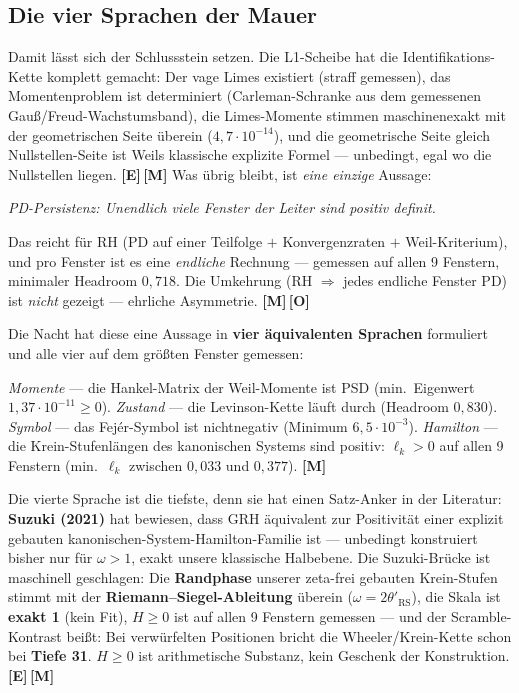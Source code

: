 \documentclass[11pt,a4paper]{article}
\newcommand{\E}{\textcolor{gut}{\textbf{[E]}}}
\newcommand{\OO}{\textcolor{offen}{\textbf{[O]}}}
\newcommand{\M}{\textcolor{mess}{\textbf{[M]}}}
\begin{document}
\subsection{Die vier Sprachen der Mauer}

Damit lässt sich der Schlussstein setzen. Die L1-Scheibe hat die
Identifikations-Kette komplett gemacht: Der vage Limes existiert
(straff gemessen), das Momentenproblem ist determiniert
(Carleman-Schranke aus dem gemessenen Gauß/Freud-Wachstumsband),
die Limes-Momente stimmen maschinenexakt mit der geometrischen
Seite überein ($4{,}7 \cdot 10^{-14}$), und die geometrische Seite
gleich Nullstellen-Seite ist Weils klassische explizite Formel ---
unbedingt, egal wo die Nullstellen liegen. \E{}\,\M{} Was übrig
bleibt, ist \emph{eine einzige} Aussage:

\begin{center}
\emph{PD-Persistenz: Unendlich viele Fenster der Leiter sind
positiv definit.}
\end{center}

Das reicht für RH (PD auf einer Teilfolge $+$ Konvergenzraten $+$
Weil-Kriterium), und pro Fenster ist es eine \emph{endliche}
Rechnung --- gemessen auf allen 9 Fenstern, minimaler Headroom
$0{,}718$. Die Umkehrung (RH $\Rightarrow$ jedes endliche Fenster
PD) ist \emph{nicht} gezeigt --- ehrliche Asymmetrie. \M{}\,\OO{}

Die Nacht hat diese eine Aussage in \textbf{vier äquivalenten
Sprachen} formuliert und alle vier auf dem größten Fenster
gemessen:

\emph{Momente} --- die Hankel-Matrix der Weil-Momente ist PSD
(min.\ Eigenwert $1{,}37 \cdot 10^{-11} \ge 0$). \emph{Zustand}
--- die Levinson-Kette läuft durch (Headroom $0{,}830$).
\emph{Symbol} --- das Fejér-Symbol ist nichtnegativ (Minimum
$6{,}5 \cdot 10^{-3}$). \emph{Hamilton} --- die
Krein-Stufenlängen des kanonischen Systems sind positiv:
$\ell_k > 0$ auf allen 9 Fenstern (min.\ $\ell_k$ zwischen
$0{,}033$ und $0{,}377$). \M{}

Die vierte Sprache ist die tiefste, denn sie hat einen Satz-Anker
in der Literatur: \textbf{Suzuki (2021)} hat bewiesen, dass GRH
äquivalent zur Positivität einer explizit gebauten
kanonischen-System-Hamilton-Familie ist --- unbedingt konstruiert
bisher nur für $\omega > 1$, exakt unsere klassische Halbebene.
Die Suzuki-Brücke ist maschinell geschlagen: Die
\textbf{Randphase} unserer zeta-frei gebauten Krein-Stufen stimmt
mit der \textbf{Riemann--Siegel-Ableitung} überein
($\omega = 2\theta'_{\mathrm{RS}}$), die Skala ist \textbf{exakt
1} (kein Fit), $H \ge 0$ ist auf allen 9 Fenstern gemessen --- und
der Scramble-Kontrast beißt: Bei verwürfelten Positionen bricht
die Wheeler/Krein-Kette schon bei \textbf{Tiefe 31}. $H \ge 0$ ist
arithmetische Substanz, kein Geschenk der Konstruktion. \E{}\,\M{}
\end{document}
